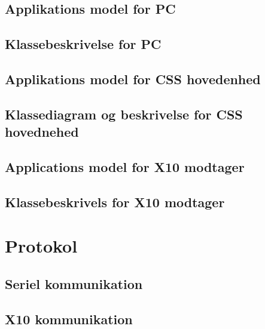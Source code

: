 \subsection{Applikations model for PC}

\clearpage

\subsection{Klassebeskrivelse for PC}

\newpage

\subsection{Applikations model for CSS hovedenhed}

\clearpage

\subsection{Klassediagram og beskrivelse for CSS hovednehed}

\newpage

\newpage
\subsection{Applications model for X10 modtager}

\clearpage

\subsection{Klassebeskrivels for X10 modtager}

\newpage

\section{Protokol}

\subsection{Seriel kommunikation}


\subsection{X10 kommunikation}

\newpage